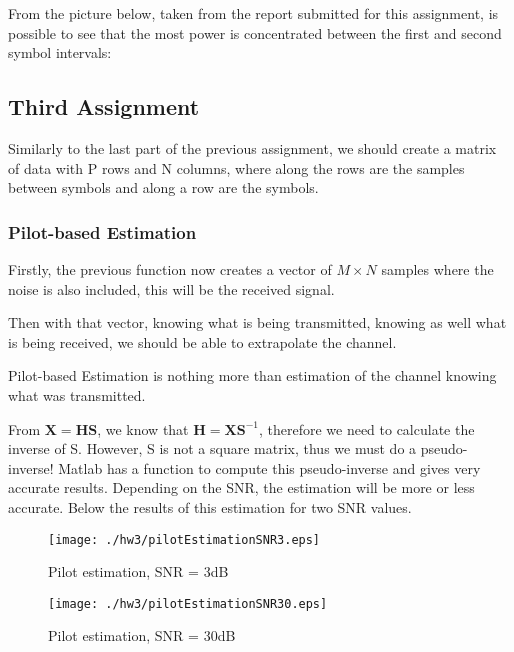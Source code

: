 \documentclass[12pt, a4paper]{article}
\begin{document}
From the picture below, taken from the report submitted for this assignment, is possible to see that the most power is concentrated between the first and second symbol intervals:








\subsection{Third Assignment}
\par Similarly to the last part of the previous assignment, we should create a matrix of data with P rows and N columns, where along the rows are the samples between symbols and along a row are the symbols.

\subsubsection{Pilot-based Estimation}

\par Firstly, the previous function  now creates a vector of $M\times N$ samples where the noise is also included, this will be the received signal.


\par Then with that vector, knowing what is being transmitted, knowing as well what is being received, we should be able to extrapolate the channel.

\par Pilot-based Estimation is nothing more than estimation of the channel knowing what was transmitted.

From $\mathbf{X} = \mathbf{H S}$, we know that $\mathbf{H} = \mathbf{X S}^{-1}$, therefore we need to calculate the inverse of S. However, S is not a square matrix, thus we must do a pseudo-inverse! Matlab has a function to compute this pseudo-inverse and gives very accurate results. Depending on the SNR, the estimation will be more or less accurate.
Below the results of this estimation for two SNR values.


\begin{figure}[h]
    \centering
    \begin{minipage}{.49\textwidth}
      \centering
      \texttt{[image: ./hw3/pilotEstimationSNR3.eps]}
      \caption{Pilot estimation, SNR = 3dB}
      \label{fig:pilot1}
    \end{minipage}
    \begin{minipage}{.49\textwidth}
      \centering
      \texttt{[image: ./hw3/pilotEstimationSNR30.eps]}
      \caption{Pilot estimation, SNR = 30dB}
      \label{fig:pilot2}
    \end{minipage}
\end{figure}
\end{document}
